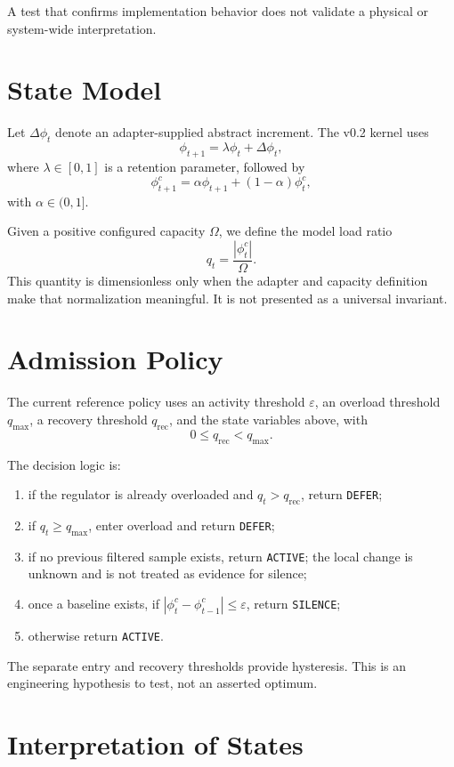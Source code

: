 \documentclass[11pt]{article}
\begin{document}
A test that confirms implementation behavior does not validate a physical or
system-wide interpretation.

\section{State Model}

Let $\Delta\phi_t$ denote an adapter-supplied abstract increment. The v0.2
kernel uses
\[
\phi_{t+1}=\lambda\phi_t+\Delta\phi_t,
\]
where $\lambda\in[0,1]$ is a retention parameter, followed by
\[
\phi^c_{t+1}=\alpha\phi_{t+1}+(1-\alpha)\phi^c_t,
\]
with $\alpha\in(0,1]$.

Given a positive configured capacity $\Omega$, we define the model load ratio
\[
q_t=\frac{|\phi^c_t|}{\Omega}.
\]
This quantity is dimensionless only when the adapter and capacity definition
make that normalization meaningful. It is not presented as a universal
invariant.

\section{Admission Policy}

The current reference policy uses an activity threshold $\varepsilon$, an
overload threshold $q_{\max}$, a recovery threshold $q_{\mathrm{rec}}$, and
the state variables above, with
\[
0\le q_{\mathrm{rec}}<q_{\max}.
\]

The decision logic is:
\begin{enumerate}
\item if the regulator is already overloaded and $q_t>q_{\mathrm{rec}}$,
return \texttt{DEFER};
\item if $q_t\ge q_{\max}$, enter overload and return \texttt{DEFER};
\item if no previous filtered sample exists, return \texttt{ACTIVE}; the local
change is unknown and is not treated as evidence for silence;
\item once a baseline exists, if
$|\phi^c_t-\phi^c_{t-1}|\le\varepsilon$, return \texttt{SILENCE};
\item otherwise return \texttt{ACTIVE}.
\end{enumerate}

The separate entry and recovery thresholds provide hysteresis. This is an
engineering hypothesis to test, not an asserted optimum.

\section{Interpretation of States}
\end{document}
